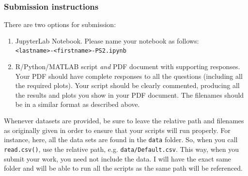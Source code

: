 \documentclass[11pt,twoside]{article}
\newcommand{\pts}[1]{\marginpar{ \small\hspace{0pt} \textit{[#1]} } }
\newcommand{\?}{\stackrel{?}{=}}
\begin{document}
\subsubsection*{Submission instructions}
There are two options for submission:
\begin{enumerate}
\item JupyterLab Notebook. Please name your notebook as follows: \\ \texttt{<lastname>-<firstname>-PS2.ipynb}
\item R/Python/MATLAB script \textit{and} PDF document with supporting responses.
  Your PDF should have complete responses to all the questions (including all the required plots).
  Your script should be clearly commented, producing all the results and plots you show in your PDF document.
  The filenames should be in a similar format as described above.
\end{enumerate}
Whenever datasets are provided, be sure to leave the relative path and filenames as originally given in order to ensure that your scripts will run properly.
For instance, here, all the data sets are found in the \texttt{data} folder. So, when you call \texttt{read.csv()}, use the relative path, e.g. \texttt{data/Default.csv}.
This way, when you submit your work, you need not include the data. I will have the exact same folder and will be able to run all the scripts as the same path will be referenced.

\eject



\end{document}
